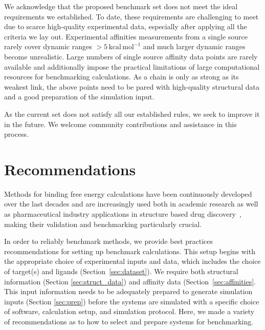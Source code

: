 \documentclass[9pt,bestpractices]{livecoms}
\begin{document}
We acknowledge that the proposed benchmark set does not meet the ideal requirements we established. To date, these requirements are challenging to meet due to scarce high-quality experimental data, especially after applying all the criteria we lay out. Experimental affinities measurements from a single source rarely cover dynamic ranges $>5\,\mathrm{kcal\,mol^{-1}}$ and much larger dynamic ranges become unrealistic. Large numbers of single source affinity data points are rarely available and additionally impose the practical limitations of large computational resources for benchmarking calculations. As a chain is only as strong as its weakest link, the above points need to be pared with high-quality structural data and a good preparation of the simulation input. 

As the current set does not satisfy all our established rules, we seek to improve it in the future. We welcome community contributions and assistance in this process. 

\section{Recommendations}
\label{sec:recommendations}

Methods for binding free energy calculations have been continuously developed over the last decades and are increasingly used both in academic research as well as pharmaceutical industry applications in structure based drug discovery~\cite{sherborne_collaborating_2016, gapsysLargeScaleRelative2020,schindler_largescale_2020}, making their validation and benchmarking particularly crucial. 
%

In order to reliably benchmark methods, we provide best practices recommendations for setting up benchmark calculations.
This setup begins with the appropriate choice of experimental inputs and data, which includes the choice of target(s) and ligands (Section~\ref{sec:dataset}). 
We require both
structural information (Section \ref{sec:struct_data}) and 
affinity data (Section~\ref{sec:affinities}.
This input information needs to be adequately prepared to generate simulation inputs (Section \ref{sec:prep}) before the systems are simulated with a specific choice of 
software, calculation setup, and simulation protocol. 
Here, we made a variety of recommendations as to how to select and prepare systems for benchmarking.
\end{document}
